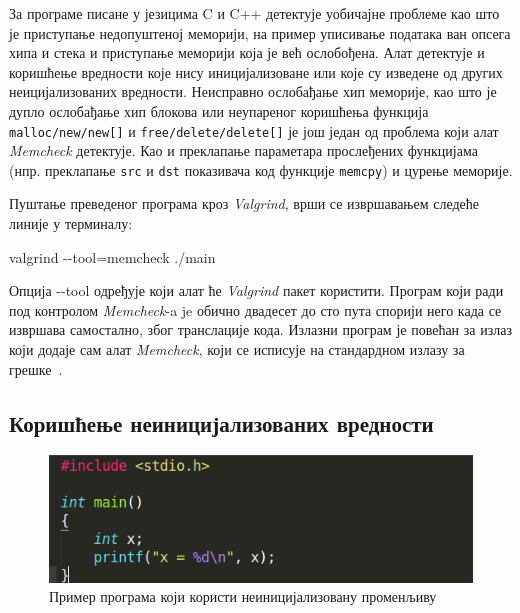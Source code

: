 \documentclass[12pt,oneside]{memoir}
\begin{document}
\indent За програме писане у језицима C и C++ детектује уобичајне проблеме као што је приступање недопуштеној меморији, на пример уписивање података ван опсега хипа и стека и приступање меморији која је већ ослобођена. Алат детектује и коришћење вредности које нису иницијализоване или које су изведене од других неицијализованих вредности. Неисправно ослобађање хип меморије, као што је дупло ослобађање хип блокова или неупареног коришћења функција \texttt{malloc/new/new[]} и \texttt{free/delete/delete[]} је још један од проблема који алат \textit{Memcheck} детектује. Као и преклапање параметара прослеђених функцијама (нпр. преклапање \texttt{src} и \texttt{dst} показивача код функције \texttt{memcpy}) и цурење меморије.

\indent Пуштање преведеног програма кроз \textit{Valgrind}, врши се извршавањем следеће линије у терминалу:

\begin{center}
\large
 valgrind -\--tool=memcheck ./main
\end{center}

\indent Опција -\--tool одређује који алат ће \textit{Valgrind} пакет користити. Програм који ради под контролом \textit{Memcheck}-a je обично двадесет до сто пута спорији него када се извршава самостално, због транслације кода. Излазни програм је повећан за излаз који додаје сам алат \textit{Memcheck}, који се исписује на стандардном излазу за грешке~\cite{memcheckRef}.



\subsection{Коришћење неиницијализованих вредности}

\begin{figure}[h!]
\begin{center}
\includegraphics[scale=0.75]{slika1.png}
\end{center}
\caption{Пример програма који користи неиницијализовану променљиву}
\label{fig:main}
\end{figure}
\end{document}
